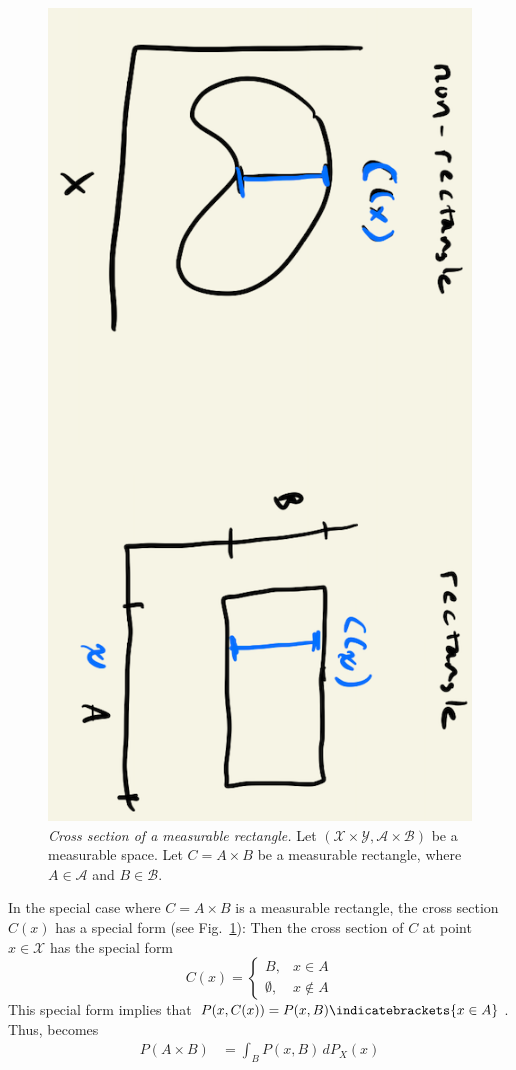 \documentclass{article} %
\begin{document}
\begin{figure}[H]
\centering
\includegraphics[angle=90, width=.6\textwidth]{images/cross_section_of_rectangle}
\caption{\textit{Cross section of a measurable rectangle.} Let $(\mathcal{X} \times \mathcal{Y}, \mathcal{A} \times \mathcal{B})$ be a measurable space. Let $C=A \times B$ be a measurable rectangle, where $A \in \mathcal{A}$ and $B \in \mathcal{B}$.}
\label{fig:cross_sections_of_rectangles}
\end{figure}

 In the special case where $C=A \times B$ is a measurable rectangle, the cross section $C(x)$ has a special form (see Fig.~\ref{fig:cross_sections_of_rectangles}):
  Then the cross section of $C$ at point $x \in \mathcal{X}$ has the special form 
\[C(x) = 
\begin{cases}
B, &  x \in A \\
\emptyset, & x \not\in A 	
 \end{cases}
 \]
This special form implies that $P(x,C(x))=P(x,B)\indicatebrackets{x \in A}$. Thus,  	 becomes 
%
\begin{align}
P(A \times B) &= \int_B P(x, B) \, dP_X(x)
\label{eqn:probability_of_rectangle}	
\end{align}
\end{document}
